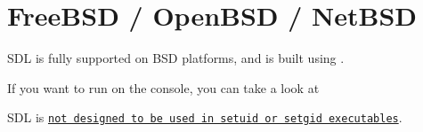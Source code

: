 \chapter{Free\+BSD /\+ Open\+BSD /\+ Net\+BSD }
\hypertarget{md__mono_runtime_2extern_2sdl_2docs_2_r_e_a_d_m_e-bsd}{}\label{md__mono_runtime_2extern_2sdl_2docs_2_r_e_a_d_m_e-bsd}
\label{md__mono_runtime_2extern_2sdl_2docs_2_r_e_a_d_m_e-bsd_autotoc_md1208}%
%


SDL is fully supported on BSD platforms, and is built using .

If you want to run on the console, you can take a look at 

SDL is \href{README-platforms.md\#setuid}{\texttt{not designed to be used in setuid or setgid executables}}. 